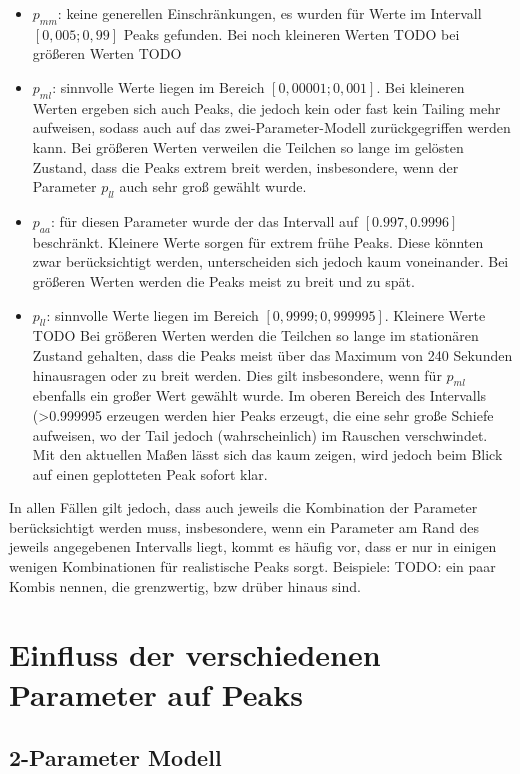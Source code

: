 \begin{itemize}
 \item $p_{mm}$: keine generellen Einschränkungen, es wurden für Werte im Intervall $[0,005; 0,99]$ Peaks gefunden. Bei noch kleineren Werten TODO bei größeren Werten TODO
 \item $p_{ml}$: sinnvolle Werte liegen im Bereich $[0,00001; 0,001]$. Bei kleineren Werten ergeben sich auch Peaks, die jedoch kein oder fast kein Tailing mehr aufweisen, sodass auch auf das zwei-Parameter-Modell zurückgegriffen werden kann. Bei größeren Werten verweilen die Teilchen so lange im gelösten Zustand, dass die Peaks extrem breit werden, insbesondere, wenn der Parameter $p_{ll}$ auch sehr groß gewählt wurde.
 \item $p_{aa}$: für diesen Parameter wurde der das Intervall auf $[0.997, 0.9996]$ beschränkt. Kleinere Werte sorgen für extrem frühe Peaks. Diese könnten zwar berücksichtigt werden, unterscheiden sich jedoch kaum voneinander. Bei größeren Werten werden die Peaks meist zu breit und zu spät. 
 \item $p_{ll}$: sinnvolle Werte liegen im Bereich $[0,9999; 0,999995]$. Kleinere Werte TODO Bei größeren Werten werden die Teilchen so lange im stationären Zustand gehalten, dass die Peaks meist über das Maximum von 240 Sekunden hinausragen oder zu breit werden. Dies gilt insbesondere, wenn für $p_{ml}$ ebenfalls ein großer Wert gewählt wurde. Im oberen Bereich des Intervalls (>0.999995 erzeugen werden hier Peaks erzeugt, die eine sehr große Schiefe aufweisen, wo der Tail jedoch (wahrscheinlich) im Rauschen verschwindet. Mit den aktuellen Maßen lässt sich das kaum zeigen, wird jedoch beim Blick auf einen geplotteten Peak sofort klar.
\end{itemize}

In allen Fällen gilt jedoch, dass auch jeweils die Kombination der Parameter berücksichtigt werden muss, insbesondere, wenn ein Parameter am Rand des jeweils angegebenen Intervalls liegt, kommt es häufig vor, dass er nur in einigen wenigen Kombinationen für realistische Peaks sorgt.
Beispiele: TODO: ein paar Kombis nennen, die grenzwertig, bzw drüber hinaus sind.



\section{Einfluss der verschiedenen Parameter auf Peaks}

\subsection{2-Parameter Modell} 


